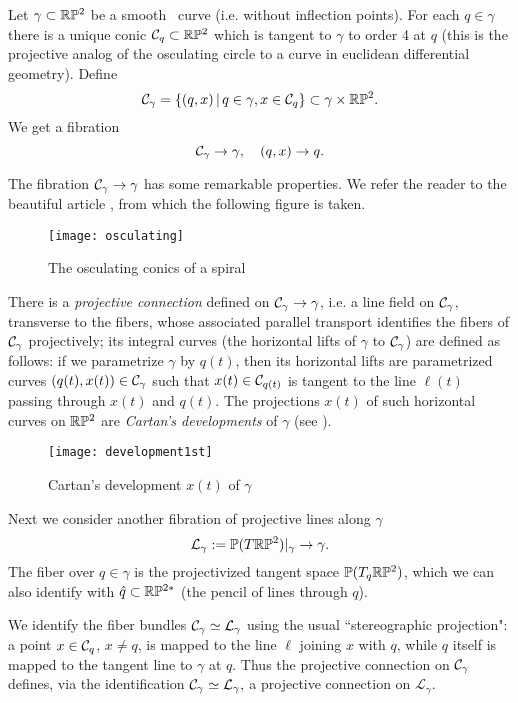 \newcommand{\LL}{\mathcal L}

 Let    $\gamma\subset\mathbb{R}\mathbb{P}^2$ be a smooth \lc\ curve (i.e. without   inflection points).  
For each $q\in\gamma$ there is a unique conic $\mathcal{C}_q\subset \mathbb{R}\mathbb{P}^2$ which is tangent to 
$\gamma$ to order 4 at $q$ (this is the projective analog of the osculating circle to a curve 
in euclidean differential geometry). Define $$\mathcal{C}_\gamma=\{(q,x)\, | \, q\in \gamma, x\in \mathcal{C}_q\}\subset \gamma\times\mathbb{R}\mathbb{P}^2.$$ We get a fibration 
\renewcommand{\II}{\mathbb I}
$$\mathcal{C}_\gamma\to \gamma, \quad (q,x)\to q.$$ 



\begin{rmrk}  The fibration $\mathcal{C}_\gamma\to \gamma$ has some remarkable properties. We refer the reader to the beautiful article \cite{GTT}, from which the following figure is taken. 
 \end{rmrk}
%
\begin{figure}[h]\centering
\texttt{[image: osculating]}
\caption{\small The osculating conics of a spiral }
\end{figure}
%
There is a {\em projective connection}  defined on $\mathcal{C}_\gamma\to \gamma$, i.e. a line field on $\mathcal{C}_\gamma$, transverse to the fibers, whose associated parallel transport identifies the fibers of $\mathcal{C}_\gamma$ projectively; its integral curves (the horizontal lifts of $\gamma$ to $\mathcal{C}_\gamma$)   are defined   as follows: if we parametrize $\gamma$ by $q(t)$, then its horizontal lifts are parametrized curves $(q(t),x(t))\in\mathcal{C}_\gamma$ such that  $x(t)\in\mathcal{C}_{q(t)}$ is tangent to the line $\ell(t)$ passing through  $x(t)$ and  $q(t)$.  The projections $x(t)$ of such  horizontal curves on $\mathbb{R}\mathbb{P}^2$  are   {\em Cartan's developments} of 
$\gamma$ (see \cite[p.~58]{Cbook}). 

\begin{figure}[H]\centering
\texttt{[image: development1st]}
\caption{\small Cartan's development  $x(t)$ of $\gamma$}
\end{figure}

Next we consider another  fibration of projective lines along $\gamma$
$$\LL_\gamma:= \P(T\RPt)|_\gamma\to \gamma.$$
The fiber over $q\in\gamma$ is the projectivized tangent space $\mathbb{P}(T_q\mathbb{R}\mathbb{P}^2)$, which we can also identify with $\hat q\subset\mathbb{R}\mathbb{P}^{2*}$ (the pencil of lines through $q$). 



 We    identify the  fiber bundles $\CC_\gamma\simeq \LL_\gamma$ using the usual ``stereographic projection": a point $x\in \mathcal{C}_{q}$, $x\neq q$, is mapped to  the line $\ell$ joining $x$ with $q$, while $q$ itself is mapped to the tangent line to $\gamma$ at $q$. 
 Thus the projective connection on $\mathcal{C}_\gamma$ defines, via the identification $\CC_\gamma\simeq \LL_\gamma,$
a projective connection on $\LL_\gamma.$


